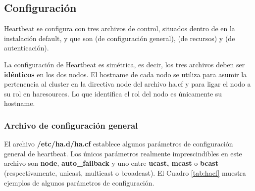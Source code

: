 \subsection{Configuración}
Heartbeat se configura con tres archivos de control, situados dentro de  en la instalación default, y que son  (de configuración general),  (de recursos) y  (de autenticación). 

La configuración de Heartbeat es simétrica, es decir, los tres archivos deben ser \textbf{idénticos} en los dos nodos. El hostname de cada nodo se utiliza para asumir la pertenencia al cluster en la directiva node del archivo ha.cf y para ligar el nodo a su rol en haresources. Lo que identifica el rol del nodo es únicamente su hostname. 

\subsubsection{Archivo de configuración general}
El archivo \textbf{/etc/ha.d/ha.cf} establece algunos parámetros de configuración general de heartbeat. Los únicos parámetros realmente imprescindibles en este archivo son \textbf{node}, \textbf{auto\_failback} y uno entre \textbf{ucast, mcast} o \textbf{bcast} (respectivamente, unicast, multicast o broadcast). El Cuadro \ref{tab:hacf} muestra ejemplos de algunos parámetros de configuración. 



